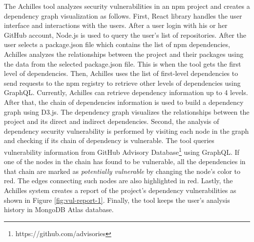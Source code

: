\documentclass[conference]{IEEEtran}
\begin{document}
	The Achilles tool analyzes security vulnerabilities in an npm project and creates a dependency graph visualization as follows.
	First, React library handles the user interface and interactions with the users. After a user login with his or her GitHub account, Node.js is used to query the user's list of repositories. After the user selects a package.json file which contains the list of npm dependencies, Achilles analyzes the relationships between the project and their packages using the data from the selected package.json file. This is when the tool gets the first level of dependencies. Then, Achilles  uses the list of first-level dependencies to send requests to the npm registry to retrieve other levels of dependencies using GraphQL. Currently, Achilles can retrieve dependency information up to 4 levels.
	After that, the chain of dependencies information is used to build a dependency graph using D3.js. The dependency graph visualizes the relationships between the project and its direct and indirect dependencies.
	Second, the analysis of dependency security vulnerability is performed by visiting each node in the graph and checking if its chain of dependency is vulnerable. The tool queries vulnerability information from GitHub Advisory Database\footnote{https://github.com/advisories} using GraphQL. If one of the nodes in the chain has found to be vulnerable, all the dependencies in that chain are marked as \textit{potentially vulnerable} by changing the node's color to red. The edges connecting such nodes are also highlighted in red. 
	Lastly, the Achilles system creates a report of the project's dependency vulnerabilities as shown in Figure \ref{fig:vul-report-1}.
	Finally, the tool keeps the user's analysis history in MongoDB Atlas database.
	
	
	
\end{document}
